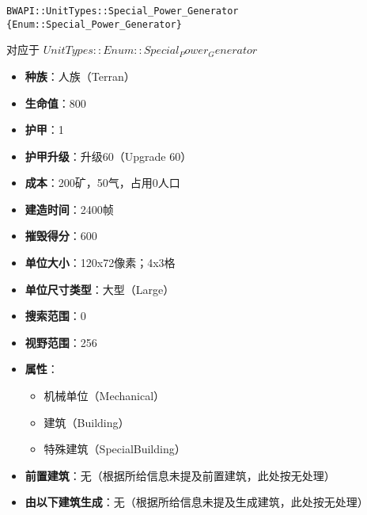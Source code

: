 \begin{tcolorbox}[colback=white, colframe=black!60!white, title=Special\_Power\_Generator(), arc=0mm]
    \begin{verbatim}
BWAPI::UnitTypes::Special_Power_Generator {Enum::Special_Power_Generator}
    \end{verbatim}
    对应于  $ UnitTypes::Enum::Special_Power_Generator $ 
    \begin{itemize}
        \item \textbf{种族}：人族（Terran）
        \item \textbf{生命值}：800
        \item \textbf{护甲}：1
        \item \textbf{护甲升级}：升级60（Upgrade 60）
        \item \textbf{成本}：200矿，50气，占用0人口
        \item \textbf{建造时间}：2400帧
        \item \textbf{摧毁得分}：600
        \item \textbf{单位大小}：120x72像素；4x3格
        \item \textbf{单位尺寸类型}：大型（Large）
        \item \textbf{搜索范围}：0
        \item \textbf{视野范围}：256
        \item \textbf{属性}：
            \begin{itemize}
                \item 机械单位（Mechanical）
                \item 建筑（Building）
                \item 特殊建筑（SpecialBuilding）
            \end{itemize}
        \item \textbf{前置建筑}：无（根据所给信息未提及前置建筑，此处按无处理）
        \item \textbf{由以下建筑生成}：无（根据所给信息未提及生成建筑，此处按无处理）
    \end{itemize} 
\end{tcolorbox}

